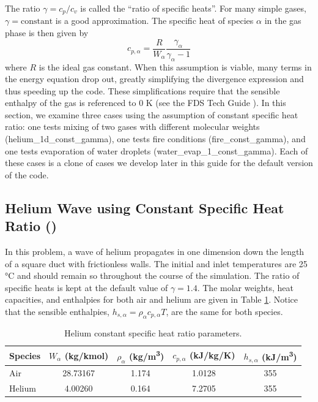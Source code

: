 \documentclass[11pt]{book}
\begin{document}
The ratio $\gamma = c_p/c_v$ is called the ``ratio of specific heats''. For many simple gases, $\gamma = \mathrm{constant}$ is a good approximation.  The specific heat of species $\alpha$ in the gas phase is then given by
\begin{equation}
c_{p,\alpha} = \frac{R}{W_\alpha}\frac{\gamma_\alpha}{\gamma_\alpha-1}
\end{equation}
where $R$ is the ideal gas constant.  When this assumption is viable, many terms in the energy equation drop out, greatly simplifying the divergence expression and thus speeding up the code.  These simplifications require that the sensible enthalpy of the gas is referenced to 0 K (see the FDS Tech Guide \cite{FDS_Math_Guide}).  In this section, we examine three cases using the assumption of constant specific heat ratio: one tests mixing of two gases with different molecular weights ({\ct helium\_1d\_const\_gamma}), one tests fire conditions ({\ct fire\_const\_gamma}), and one tests evaporation of water droplets ({\ct water\_evap\_1\_const\_gamma}).  Each of these cases is a clone of cases we develop later in this guide for the default version of the code.

\subsection{Helium Wave using Constant Specific Heat Ratio (\texorpdfstring{}{helium\_1d\_const\_gamma})}
\label{helium_1d_const_gamma}

In this problem, a wave of helium propagates in one dimension down the length of a square duct with frictionless walls.  The initial and inlet temperatures are 25 \si{\degreeCelsius} and should remain so throughout the course of the simulation.  The ratio of specific heats is kept at the default value of $\gamma = 1.4$.  The molar weights, heat capacities, and enthalpies for both air and helium are given in Table \ref{tab:helium_1d_const_gamma}.  Notice that the sensible enthalpies, $h_{s,\alpha}=\rho_\alpha c_{p,\alpha} T$, are the same for both species.

\begin{table}[ht]
\centering
\caption[Helium constant specific heat ratio]{Helium constant specific heat ratio parameters.}
\begin{tabular}{lcccc}
Species & $W_\alpha$ (kg/kmol) & $\rho_\alpha$ (\si{kg/m^3}) & $c_{p,\alpha}$ (kJ/kg/K) & $h_{s,\alpha}$ (\si{kJ/m^3}) \\
\hline
Air    & 28.73167 & 1.174 & 1.0128 & 355 \\
Helium &  4.00260 & 0.164 & 7.2705 & 355 \\
\end{tabular}
\label{tab:helium_1d_const_gamma}
\end{table}
\end{document}
